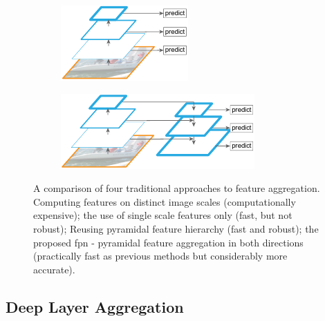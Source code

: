 \begin{figure}
    \begin{subfigure}[t]{0.4\textwidth}
        \centering
        \includegraphics[width=\textwidth]{figures/theoretical_foundations/fpn_pyramidal_feature_hierarchy.pdf}
        \caption[]{}
    \end{subfigure}
    \hfill
    \begin{subfigure}[t]{0.4\textwidth}
        \centering
        \includegraphics[width=\textwidth]{figures/theoretical_foundations/fpn_feature_pyramid_network.pdf}
        \caption[]{}
    \end{subfigure}
    \caption[\gls{fpn}]{A comparison of four traditional approaches to feature aggregation.  Computing features on distinct image scales (computationally expensive);  the use of single scale features only (fast, but not robust);  Reusing pyramidal feature hierarchy (fast and robust);  the proposed \gls{fpn} - pyramidal feature aggregation in both directions (practically fast as previous methods but considerably more accurate). }
    \label{fig:FPNVariousApproaches}
\end{figure}

\subsection{Deep Layer Aggregation}
\label{ssec:DeepLayerAggregation}

